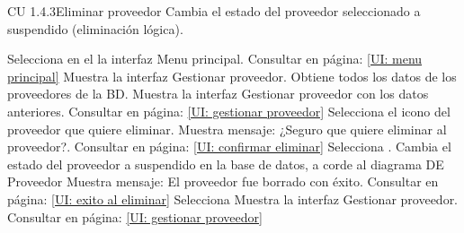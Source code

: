 \begin{UseCase} {CU 1.4.3}{Eliminar proveedor}{
	Cambia el estado del proveedor seleccionado a suspendido (eliminación lógica).\label{CU: 1.4.3}
}



\end{UseCase}


\begin{UCtrayectoria}

	\UCpaso [\UCactor]	Selecciona  en el la interfaz Menu principal. Consultar en página: \ref{UI: menu principal} 	\label{CU 1.4.3:P1}
	\UCpaso [\UCsist]		Muestra la interfaz Gestionar proveedor.  \label{CU 1.4.3:P2}
	\UCpaso [\UCsist]		Obtiene todos los datos de los proveedores de la BD. 
	\UCpaso [\UCsist]		Muestra la interfaz Gestionar proveedor con los datos anteriores. Consultar en página: \ref{UI: gestionar proveedor} \label{CU 1.4.3:P4}
	\UCpaso [\UCactor]	Selecciona el icono \btnBorrar del proveedor que quiere eliminar.\label{CU 1.4.3:P5}
	\UCpaso [\UCsist]		Muestra mensaje: ¿Seguro que quiere eliminar al proveedor?. Consultar en página: \ref{UI: confirmar eliminar}
	\UCpaso [\UCactor]	Selecciona .  
	\UCpaso [\UCsist]		Cambia el estado del proveedor a suspendido en la base de datos, a corde al diagrama DE Proveedor 
	\UCpaso [\UCsist]		Muestra mensaje: El proveedor fue borrado con éxito. Consultar en página: \ref{UI: exito al eliminar}
	\UCpaso [\UCactor]	Selecciona 
	\UCpaso [\UCsist]		Muestra la interfaz Gestionar proveedor. Consultar en página: \ref{UI: gestionar proveedor}

\end{UCtrayectoria}


